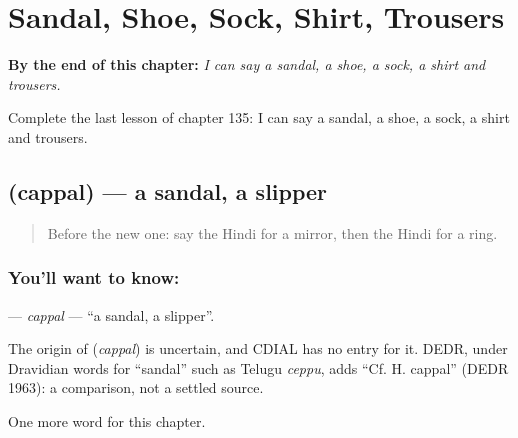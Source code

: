 
\chapter{Sandal, Shoe, Sock, Shirt, Trousers}
\label{ch:hi-sandal-shoe-sock-shirt-trousers}

\begin{chapteropening}
\textbf{By the end of this chapter:} \emph{I can say a sandal, a shoe, a sock, a shirt and trousers.}

Complete the last lesson of chapter 135: I can say a sandal, a shoe, a sock, a shirt and trousers.
\end{chapteropening}

\section[\texorpdfstring{\hi{चप्पल} (cappal)}{चप्पल (cappal)}]{ (cappal) — a sandal, a slipper}

\label{lesson:HI-C135-cappal}



\begin{quote}
Before the new one: say the Hindi for a mirror, then the Hindi for a ring.
\end{quote}

\subsection*{You'll want to know: }
\textbf{} — \emph{cappal} — \textquotedblleft{}a sandal, a slipper\textquotedblright{}.

\begin{cousinweb}
The origin of \textbf{} (\emph{cappal}) is uncertain, and CDIAL has no entry for it. DEDR, under Dravidian words for \textquotedblleft{}sandal\textquotedblright{} such as Telugu \emph{ceppu}, adds \textquotedblleft{}Cf. H. cappal\textquotedblright{} (DEDR 1963): a comparison, not a settled source.
\end{cousinweb}

\begin{grammarlens}[title={What you've built}]
One more word for this chapter.
\end{grammarlens}


